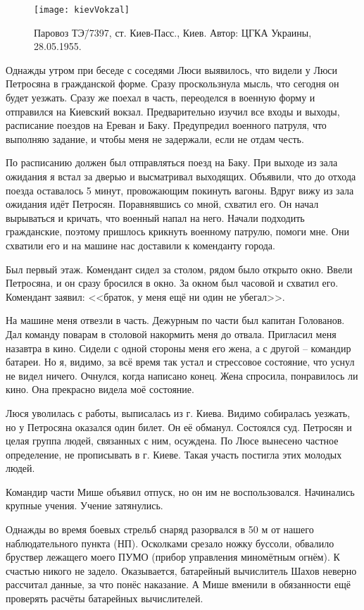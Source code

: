 \begin{wrapfigure}{O}{.4\textwidth}
\centering
\texttt{[image: kievVokzal]}
\caption{Паровоз ТЭ\=/7397, ст. Киев-Пасс., Киев. Автор: ЦГКА Украины, 28.05.1955.}
\label{fig:kievVokzal}
\end{wrapfigure}

Однажды утром при беседе с соседями Люси выявилось, что видели у Люси Петросяна в гражданской форме. Сразу проскользнула мысль, что сегодня он будет уезжать. Сразу же поехал в часть, переоделся в военную форму и отправился на Киевский вокзал. Предварительно изучил все входы и выходы, расписание поездов на Ереван и Баку. Предупредил военного патруля, что выполняю задание, и чтобы меня не задержали, если не отдам честь. 

По расписанию должен был отправляться поезд на Баку. При выходе из зала ожидания я встал за дверью и высматривал выходящих. Объявили, что до отхода поезда оставалось 5 минут, провожающим покинуть вагоны. Вдруг вижу из зала ожидания идёт Петросян. Поравнявшись со мной, схватил его. Он начал вырываться и кричать, что военный напал на него. Начали подходить гражданские, поэтому пришлось крикнуть военному патрулю, помоги мне. Они схватили его и на машине нас доставили к коменданту города. 

Был первый этаж. Комендант сидел за столом, рядом было открыто окно. Ввели Петросяна, и он сразу бросился в окно. За окном был часовой и схватил его. Комендант заявил: <<браток, у меня ещё ни один не убегал>>. 

На машине меня отвезли в часть. Дежурным по части был капитан Голованов. Дал команду поварам в столовой накормить меня до отвала. Пригласил меня назавтра в кино. Сидели с одной стороны меня его жена, а с другой \--- командир батареи. Но я, видимо, за всё время так устал и стрессовое состояние, что уснул не видел ничего. Очнулся, когда написано конец. Жена спросила, понравилось ли кино. Она прекрасно видела моё состояние. 

Люся уволилась с работы, выписалась из г. Киева. Видимо собиралась уезжать, но у Петросяна оказался один билет. Он её обманул. Состоялся суд. Петросян и целая группа людей, связанных с ним, осуждена. По Люсе вынесено частное определение, не прописывать в г. Киеве. Такая участь постигла этих молодых людей.

Командир части Мише объявил отпуск, но он им не воспользовался. Начинались крупные учения. Учение затянулись.

Однажды во время боевых стрельб снаряд разорвался в 50 м от нашего наблюдательного пункта (НП). Осколками срезало ножку буссоли, обвалило бруствер лежащего моего ПУМО (прибор управления миномётным огнём). К счастью никого не задело. Оказывается, батарейный вычислитель Шахов неверно рассчитал данные, за что понёс наказание. А Мише вменили в обязанности ещё проверять расчёты батарейных вычислителей. 

